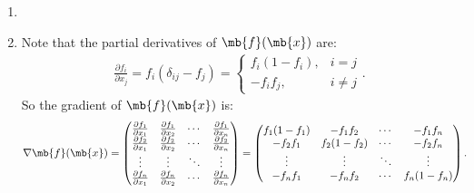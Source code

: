 \begin{exercise}
\begin{enumerate}
            \begin{solution}
                \begin{enumerate}
                    \item []
                    \item Note that the partial derivatives of $\mb{f}(\mb{x})$ are:
                        \begin{align*}
                            \frac{\partial f_i}{\partial x_j} = f_i(\delta_{ij} - f_j) =
                            \begin{cases}
                                f_i(1-f_i), & i=j     \\
                                - f_i f_j,  & i\neq j
                            \end{cases}.
                        \end{align*}
                        So the gradient of $\mb{f}(\mb{x})$ is:
                        \begin{align*}
                            \nabla \mb{f}(\mb{x}) & =
                            \begin{pmatrix}
                                \frac{\partial f_1}{\partial x_1} & \frac{\partial f_1}{\partial x_2} & \cdots & \frac{\partial f_1}{\partial x_n} \\
                                \frac{\partial f_2}{\partial x_1} & \frac{\partial f_2}{\partial x_2} & \cdots & \frac{\partial f_2}{\partial x_n} \\
                                \vdots                            & \vdots                            & \ddots & \vdots                            \\
                                \frac{\partial f_n}{\partial x_1} & \frac{\partial f_n}{\partial x_2} & \cdots & \frac{\partial f_n}{\partial x_n}
                            \end{pmatrix} =
                            \begin{pmatrix}
                                f_1(1-f_1) & -f_1f_2    & \cdots & -f_1f_n    \\
                                -f_2f_1    & f_2(1-f_2) & \cdots & -f_2f_n    \\
                                \vdots     & \vdots     & \ddots & \vdots     \\
                                -f_nf_1    & -f_nf_2    & \cdots & f_n(1-f_n)
                            \end{pmatrix}.
                        \end{align*}

\end{enumerate}
\end{solution}
\end{enumerate}
\end{exercise}
